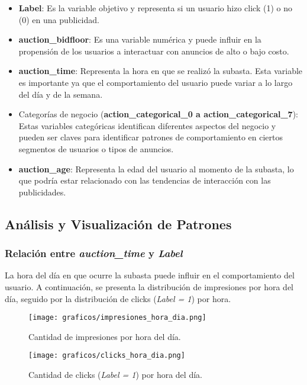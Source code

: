\documentclass[a4paper,12pt]{article}
\begin{document}
\begin{itemize}
    \item \textbf{Label}: Es la variable objetivo y representa si un usuario hizo click (1) o no (0) en una publicidad.
    
    \item \textbf{auction\_bidfloor}: Es una variable numérica y puede influir en la propensión de los usuarios a interactuar con anuncios de alto o bajo costo.
    
    \item \textbf{auction\_time}: Representa la hora en que se realizó la subasta. Esta variable es importante ya que el comportamiento del usuario puede variar a lo largo del día y de la semana.
    
    \item Categorías de negocio (\textbf{action\_categorical\_0 a action\_categorical\_7}): Estas variables categóricas identifican diferentes aspectos del negocio y pueden ser claves para identificar patrones de comportamiento en ciertos segmentos de usuarios o tipos de anuncios.
    
    \item \textbf{auction\_age}: Representa la edad del usuario al momento de la subasta, lo que podría estar relacionado con las tendencias de interacción con las publicidades.
\end{itemize}

\subsection{Análisis y Visualización de Patrones}

\subsubsection{Relación entre \textit{auction\_time} y \textit{Label}}

La hora del día en que ocurre la subasta puede influir en el comportamiento del usuario. A continuación, se presenta la distribución de impresiones por hora del día, seguido por la distribución de clicks (\textit{Label = 1}) por hora.

\begin{figure}[H]
    \centering
    \begin{minipage}{0.48\textwidth}
        \centering
        \texttt{[image: graficos/impresiones\_hora\_dia.png]}
        \caption{Cantidad de impresiones por hora del día.}
    \end{minipage}
    \hfill
    \begin{minipage}{0.48\textwidth}
        \centering
        \texttt{[image: graficos/clicks\_hora\_dia.png]}
        \caption{Cantidad de clicks (\textit{Label = 1}) por hora del día.}
    \end{minipage}
\end{figure}
\end{document}
